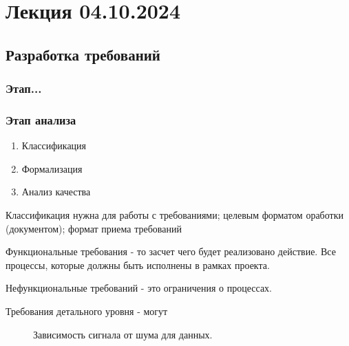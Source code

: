 \documentclass[a4paper,12pt]{article}
\begin{document}
\section{Лекция 04.10.2024}\label{}
\subsection{Разработка требований}

\subsubsection{Этап...}

\subsubsection{Этап анализа}

\begin{enumerate}
    \item {Классификация}\label{classfic}
    \item Формализация
    \item Анализ качества
\end{enumerate}

Классификация нужна для работы с требованиями; 
целевым форматом оработки (документом); 
формат приема требований



Функциональные требования - то засчет чего будет реализовано действие. 
Все процессы, которые должны быть исполнены в рамках проекта.


Нефункциональные требований - это ограничения о процессах.


Требования детального уровня - могут  


\begin{figure}[h]
    \caption{Зависимость сигнала от шума для данных.}
    \label{ris:image}
\end{figure}
\end{document}
